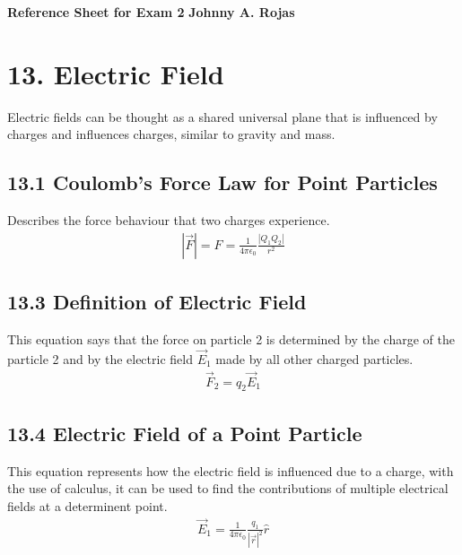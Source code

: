 \documentclass[12pt,twocolumn]{article}
\begin{document}
\begin{center}
  {\Large \textbf{Reference Sheet for Exam 2}}
  {\textbf{Johnny A. Rojas }}\\
\end{center}

\section*{13. Electric Field}
Electric fields can be thought as a shared universal plane that is influenced by
charges and influences charges, similar to gravity and mass.

\subsection*{13.1 Coulomb's Force Law for Point Particles}
Describes the force behaviour that two charges experience.
\begin{align*}
  |\overrightarrow{F}| = F = \frac{1}{4 \pi \epsilon_0} \frac{|Q_1Q_2|}{r^2}
\end{align*}
\subsection*{13.3 Definition of Electric Field}
This equation says that the force on particle 2 is determined by the charge of
the particle 2 and by the electric field $\overrightarrow{E}_1$ made by all
other charged particles.
\begin{align*}
  \overrightarrow{F}_2 = q_2 \overrightarrow{E}_1
\end{align*}
\subsection*{13.4 Electric Field of a Point Particle}
This equation represents how the electric field is influenced due to a charge,
with the use of calculus, it can be used to find the contributions of multiple
electrical fields at a determinent point.
\begin{align*}
  \overrightarrow{E}_1 = \frac{1}{4 \pi \epsilon_0} \frac{q_1}{|\overrightarrow{r}|^2} \hat{r}
\end{align*}
\end{document}

